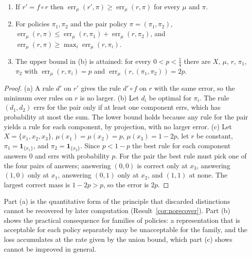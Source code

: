 \begin{newresult}\label{prop:approx}
\begin{enumerate}[nosep,label=(\alph*)]
  \item If $r'=f\circ r$ then $\operatorname{err}_\mu(r',\pi)\ge\operatorname{err}_\mu(r,\pi)$ for every $\mu$ and $\pi$.
  \item For policies $\pi_1,\pi_2$ and the pair policy $\pi=(\pi_1,\pi_2)$, $\operatorname{err}_\mu(r,\pi)\le\operatorname{err}_\mu(r,\pi_1)+\operatorname{err}_\mu(r,\pi_2)$, and $\operatorname{err}_\mu(r,\pi)\ge\max_i\operatorname{err}_\mu(r,\pi_i)$.
  \item The upper bound in (b) is attained: for every $0<p<\tfrac14$ there are $X$, $\mu$, $r$, $\pi_1$, $\pi_2$ with $\operatorname{err}_\mu(r,\pi_i)=p$ and $\operatorname{err}_\mu(r,(\pi_1,\pi_2))=2p$.
\end{enumerate}
\end{newresult}
\begin{proof}
(a) A rule $d'$ on $r'$ gives the rule $d'\circ f$ on $r$ with the same error, so the minimum over rules on $r$ is no larger. (b) Let $d_i$ be optimal for $\pi_i$. The rule $(d_1,d_2)$ errs for the pair only if at least one component errs, which has probability at most the sum. The lower bound holds because any rule for the pair yields a rule for each component, by projection, with no larger error. (c) Let $X=\{x_1,x_2,x_3\}$, $\mu(x_1)=\mu(x_2)=p$, $\mu(x_3)=1-2p$, let $r$ be constant, $\pi_1=\mathbf 1_{\{x_1\}}$, and $\pi_2=\mathbf 1_{\{x_2\}}$. Since $p<1-p$ the best rule for each component answers $0$ and errs with probability $p$. For the pair the best rule must pick one of the four pairs of answers; answering $(0,0)$ is correct only at $x_3$, answering $(1,0)$ only at $x_1$, answering $(0,1)$ only at $x_2$, and $(1,1)$ at none. The largest correct mass is $1-2p>p$, so the error is $2p$.
\end{proof}

Part (a) is the quantitative form of the principle that discarded distinctions cannot be recovered by later computation (Result~\ref{cor:norecover}). Part (b) shows the practical consequence for families of policies: a representation that is acceptable for each policy separately may be unacceptable for the family, and the loss accumulates at the rate given by the union bound, which part (c) shows cannot be improved in general.


